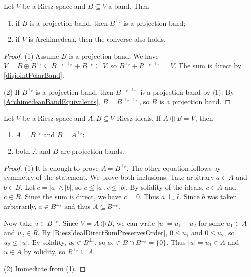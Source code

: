 \begin{lemma}
Let $V$ be a Riesz space and $B\subseteq V$ a band. Then
\begin{enumerate}
\item if $B$ is a projection band, then $B^{\perp_r}$ is a projection band;
\item if $V$ is Archimedean, then the converse also holds.
\end{enumerate}
\end{lemma}
\begin{proof}
(1) Assume $B$ is a projection band. We have $V = B\oplus B^{\perp_r} \subseteq B^{\perp_r\perp_r} + B^{\perp_r} \subseteq V$, so $B^{\perp_r} + B^{\perp_r\perp_r} = V$. The sum is direct by \ref{disjointPolarBand}.

(2) If $B^{\perp_r}$ is a projection band, then $B^{\perp_r\perp_r}$ is a projection band by (1). By \ref{ArchimedeanBandEquivalents}, $B = B^{\perp_r\perp_r}$, so $B$ is a projection band.
\end{proof}

\begin{proposition} \label{complementaryRieszIdealsProjectionBands}
Let $V$ be a Riesz space and $A,B\subseteq V$ Riesz ideals. If $A \oplus B = V$, then
\begin{enumerate}
\item $A = B^{\perp_r}$ and $B = A^{\perp_r}$;
\item both $A$ and $B$ are projection bands.
\end{enumerate}
\end{proposition}
\begin{proof}
(1) It is enough to prove $A = B^{\perp_r}$. The other equation follows by symmetry of the statement. We prove both inclusions. Take arbitrary $a\in A$ and $b\in B$. Let $c = |a|\wedge |b|$, so $c\leq |a|, c\leq |b|$. By solidity of the ideals, $c\in A$ and $c\in B$. Since the sum is direct, we have $c = 0$. Thus $a\perp_r b$. Since $b$ was taken arbitrarily, $a\in B^{\perp_r}$ and thus $A\subseteq B^{\perp_r}$.

Now take $u\in B^{\perp_r}$. Since $V = A\oplus B$, we can write $|u| = u_1 + u_2$ for some $u_1\in A$ and $u_2\in B$. By \ref{RieszIdealDirectSumPreservesOrder}, $0\leq u_1$ and $0\leq u_2$, so $u_2 \leq |u|$. By solidity, $u_2\in B^{\perp_r}$, so $u_2\in B\cap B^{\perp_r} = \{0\}$. Thus $|u| = u_1\in A$ and $u\in A$ by solidity, so $B^{\perp_r} \subseteq A$.

(2) Immediate from (1).
\end{proof}

